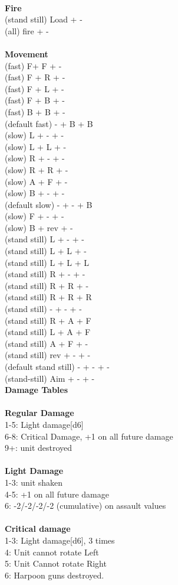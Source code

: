 \ \\ {\bf Fire } \\
(stand still) Load + - \\
(all) fire + - \\
\ \\ {\bf Movement } \\
(fast) F+ F + - \\
(fast) F + R + - \\
(fast) F + L + - \\
(fast) F + B + - \\
(fast) B + B + - \\
(default fast) - + B + B \\
(slow) L + - + - \\
(slow) L + L + - \\
(slow) R + - + - \\
(slow) R + R + - \\
(slow) A + F + - \\
(slow) B + - + - \\
(default slow)  - + - + B \\
(slow) F + - + - \\
(slow) B + rev + - \\
(stand still) L + - + - \\
(stand still) L + L + - \\
(stand still) L + L + L \\
(stand still) R + - + - \\
(stand still) R + R + - \\
(stand still) R + R + R \\
(stand still) - + - + - \\
(stand still) R + A + F \\
(stand still) L + A + F \\
(stand still) A + F + - \\
(stand still) rev + - + - \\
(default stand still) - + - + - \\
(stand-still) Aim + - + - \\



{\bf Damage Tables} \\
\ \\ {\bf Regular Damage } \\
1-5: Light damage[d6] \\
6-8: Critical Damage, +1 on all future damage \\
9+: unit destroyed \\
\ \\ {\bf Light Damage } \\
1-3: unit shaken \\
4-5: +1 on all future damage \\
6: -2/-2/-2/-2 (cumulative) on assault values \\
\ \\ {\bf Critical damage } \\
1-3: Light damage[d6], 3 times \\
4: Unit cannot rotate Left \\
5: Unit Cannot rotate Right \\
6: Harpoon guns destroyed. \\


